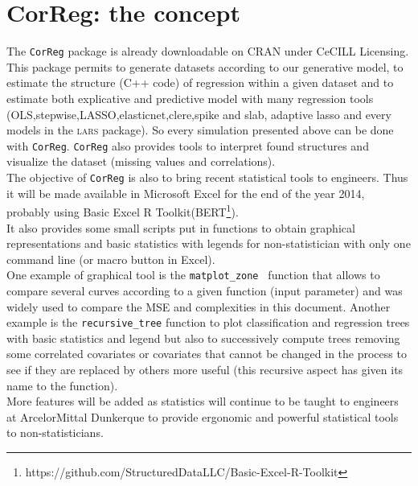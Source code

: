\documentclass[12pt,a4paper]{report}
\begin{document}
	
\section{CorReg: the concept}	
	
		The {\tt CorReg} package is already downloadable on CRAN under CeCILL Licensing. This package permits to generate datasets according to our generative model, to estimate the structure (C++ code) of regression within a given dataset and to estimate both explicative and predictive model with many regression tools (OLS,stepwise,LASSO,elasticnet,clere,spike and slab, adaptive lasso and every models in the \textsc{lars} package). So every simulation presented above can be done with {\tt CorReg}.
	{\tt CorReg} also provides tools to interpret found structures and visualize the dataset (missing values and correlations). \\%
	The objective of {\tt CorReg} is also to bring recent statistical tools to engineers. Thus it will be made available in Microsoft Excel for the end of the year 2014, probably using Basic Excel R Toolkit(BERT\footnote{https://github.com/StructuredDataLLC/Basic-Excel-R-Toolkit}). \\
	
	It also provides some small scripts put in functions to obtain graphical representations and basic statistics with legends for non-statistician with only one command line (or macro button in Excel).\\
	 One example of graphical tool is the {\tt matplot\_zone } function that allows to compare several curves according to a given function (input parameter) and was widely used to compare the MSE and complexities in this document. Another example is the {\tt recursive\_tree} function to plot classification and regression trees with basic statistics and legend but also to successively compute trees removing some correlated covariates or covariates that cannot be changed in the process to see if they are replaced by others more useful (this recursive aspect has given its name to the function).\\
	 
	More features will be added as statistics will continue to be taught to engineers at ArcelorMittal Dunkerque to provide ergonomic and powerful statistical tools to non-statisticians. 	
	
\end{document}
